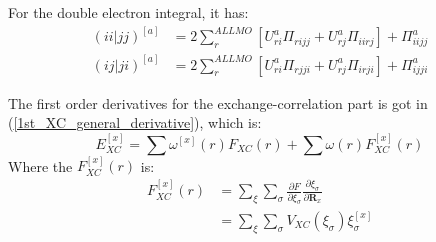 For the double electron integral, it has:
\begin{align}
  \label{1st_MO_energy_HF_gradient_eq:2}
(ii|jj)^{[a]} &= 2\sum_{r}^{ALL MO}\left[ U^{a}_{ri}\Pi_{rijj} +
U^{a}_{rj}\Pi_{iirj}\right] + \Pi^{a}_{iijj} \nonumber \\
(ij|ji)^{[a]} &= 2\sum_{r}^{ALL MO}\left[ U^{a}_{ri}\Pi_{rjji} +
U^{a}_{rj}\Pi_{irji}\right]  + \Pi^{a}_{ijji}
\end{align}

The first order derivatives for the exchange-correlation part is got in
(\ref{1st_XC_general_derivative}), which is:
\begin{equation}
  E_{XC}^{[x]} =  \sum\omega^{[x]}(r)F_{XC}(r) +
\sum\omega(r)F^{[x]}_{XC}(r) 
\label{1st_MO_energy_HF_gradient_eq:3}
\end{equation}
Where the $F^{[x]}_{XC}(r)$ is:
\begin{align}
F^{[x]}_{XC}(r) &= \sum_{\xi}\sum_{\sigma}\frac{\partial F}{\partial
\xi_{\sigma}} \frac{\partial \xi_{\sigma}}{\partial \bm{R}_{x}} \nonumber\\
&=  \sum_{\xi}\sum_{\sigma} V_{XC}(\xi_{\sigma})\xi_{\sigma}^{[x]}
 \label{1st_MO_energy_HF_gradient_eq:4}
\end{align}


